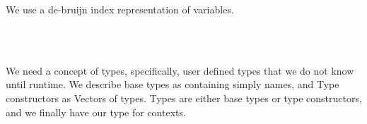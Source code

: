 
We use a de-bruijn index representation of variables.

\begin{code}%
\>[0]\AgdaSpace{}%
\AgdaSpace{}%
\AgdaSymbol{(}\AgdaSpace{}%
\AgdaSymbol{:}\AgdaSpace{}%
\AgdaSymbol{)}\AgdaSpace{}%
\AgdaSymbol{:}\AgdaSpace{}%
\AgdaSpace{}%
\AgdaSpace{}%
\AgdaSpace{}%
\AgdaSpace{}%
\<%
\\
\>[0][@{}l@{\AgdaIndent{0}}]%
\>[2]\AgdaSpace{}%
\AgdaSymbol{:}\AgdaSpace{}%
\AgdaSpace{}%
\AgdaSpace{}%
\AgdaSymbol{(}\AgdaSpace{}%
\AgdaOperator{\AgdaInductiveConstructor{-,}}\AgdaSpace{}%
\AgdaSymbol{)}\<%
\\
%
\>[2]\AgdaSpace{}%
\AgdaSymbol{:}\AgdaSpace{}%
\AgdaSpace{}%
\AgdaSpace{}%
\AgdaSpace{}%
\AgdaSpace{}%
\AgdaSpace{}%
\AgdaSpace{}%
\AgdaSymbol{(}\AgdaSpace{}%
\AgdaOperator{\AgdaInductiveConstructor{-,}}\AgdaSpace{}%
\AgdaSymbol{)}\<%
\end{code}

We need a concept of types, specifically, user defined types that we do
not know until runtime. We describe base types as containing simply names,
and Type constructors as Vectors of types. Types are either base types or
type constructors, and we finally have our type for contexts.

